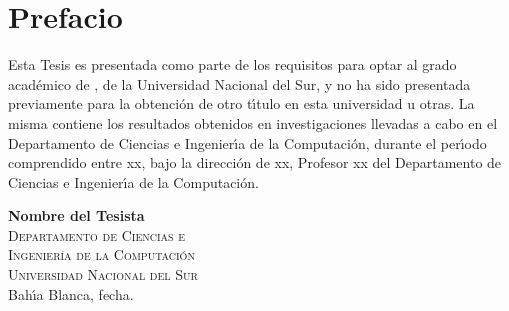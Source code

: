 


\thispagestyle{empty}
\chapter*{Prefacio}

Esta Tesis es presentada como parte de los requisitos para optar
al grado aca\-d\'e\-mi\-co de \emph{}, de la Universidad Nacional del Sur, 
y no ha sido presentada previamente para la obtenci\'on de otro t\'{\i}tulo en
esta universidad u otras. La misma contiene los resultados
obtenidos en investigaciones llevadas a cabo en el Departamento de
Ciencias e Ingenier\'{\i}a de la Computaci\'on, durante el
per\'{\i}odo comprendido entre xx, bajo la direcci\'on de xx, Profesor
xx del Departamento de Ciencias e Ingenier\'{\i}a de la
Computaci\'on.


\vspace*{5cm}

{\flushright
\textbf{Nombre del Tesista}\\
\textsc{Departamento de Ciencias e}\\
\textsc{Ingenier\'{\i}a de la Computaci\'on}\\
\textsc{Universidad Nacional del Sur}\\
Bah\'{\i}a Blanca, fecha.\\}
